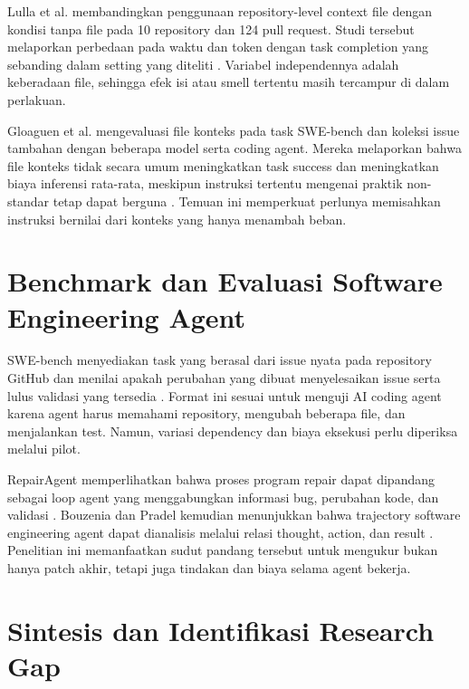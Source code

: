Lulla et al. membandingkan penggunaan repository-level context file dengan kondisi tanpa file pada 10 repository dan 124 pull request. Studi tersebut melaporkan perbedaan pada waktu dan token dengan task completion yang sebanding dalam setting yang diteliti \cite{lulla2026agents}. Variabel independennya adalah keberadaan file, sehingga efek isi atau smell tertentu masih tercampur di dalam perlakuan.

Gloaguen et al. mengevaluasi file konteks pada task SWE-bench dan koleksi issue tambahan dengan beberapa model serta coding agent. Mereka melaporkan bahwa file konteks tidak secara umum meningkatkan task success dan meningkatkan biaya inferensi rata-rata, meskipun instruksi tertentu mengenai praktik non-standar tetap dapat berguna \cite{gloaguen2026agents}. Temuan ini memperkuat perlunya memisahkan instruksi bernilai dari konteks yang hanya menambah beban.

\section{Benchmark dan Evaluasi Software Engineering Agent}

SWE-bench menyediakan task yang berasal dari issue nyata pada repository GitHub dan menilai apakah perubahan yang dibuat menyelesaikan issue serta lulus validasi yang tersedia \cite{jimenez2024swebench}. Format ini sesuai untuk menguji AI coding agent karena agent harus memahami repository, mengubah beberapa file, dan menjalankan test. Namun, variasi dependency dan biaya eksekusi perlu diperiksa melalui pilot.

RepairAgent memperlihatkan bahwa proses program repair dapat dipandang sebagai loop agent yang menggabungkan informasi bug, perubahan kode, dan validasi \cite{repairagent2025}. Bouzenia dan Pradel kemudian menunjukkan bahwa trajectory software engineering agent dapat dianalisis melalui relasi thought, action, dan result \cite{bouzenia2025trajectories}. Penelitian ini memanfaatkan sudut pandang tersebut untuk mengukur bukan hanya patch akhir, tetapi juga tindakan dan biaya selama agent bekerja.

\section{Sintesis dan Identifikasi Research Gap}

